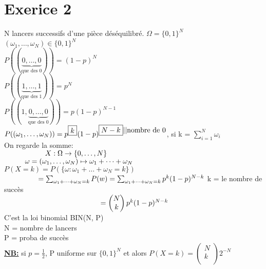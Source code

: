 \documentclass{article}
\author{Frederic Becerril}
\newcommand\tab[1][1cm]{\hspace*{#1}}
\newcommand{\important}[1]{{\color{red}\underline{\textbf{#1}}}}
\newcommand{\hbrace}[2]{\underset{#1}{\underbrace{#2}}}
\begin{document}
\part*{Exerice 2}

N lancers successifs d'une pièce déséquilibré. $\Omega = \{0, 1\}^N$\\
$(\omega_1, \dots, \omega_N) \in \{0, 1\}^N$\\
$P((\hbrace{\mbox{que des 0}}{0, \dots, 0})) = (1-p)^N$\\
$P((\hbrace{\mbox{que des 1}}{1, \dots, 1})) = p^N$\\
$P((1, \hbrace{\mbox{que des 0}}{0, \dots, 0})) = p (1-p)^{N -1}$\\
$P((\omega_1, \dots, \omega_N)) = p^{\fbox{$k$}}(1-p)^{\fbox{$N-k$}\mbox{||nombre de 0}}$, si k = $\sum_{i=1}^N \omega_i$\\
On regarde la somme:\\
$\tab[2cm] X:\Omega \rightarrow \{0, \dots, N\}$\\
$\tab \omega = (\omega_1, \dots, \omega_N) \mapsto \omega_1 + \dots + \omega_N$\\
$P(X = k) = P(\{\omega : \omega_1 + \dots + \omega_N = k\})$\\
$\tab[1.65cm] = \sum_{\omega_1 + \dots + \omega_N = k} P(w) = \sum_{\omega_1 + \dots + \omega_N = k} p^k(1-p)^{N-k}$ k = le nombre de succès \vspace{3mm}\\
$\tab[4.7cm] = \begin{pmatrix}
    N\\
    k\\
\end{pmatrix}  p^k(1-p)^{N-k}$\\
C'est la loi binomial BIN(N, P)\\
N = nombre de lancers\\
P = proba de succès\\
\important{NB:} si $p = \frac{1}{2}$, P uniforme sur $\{0, 1\}^N$ et alors $P(X = k) = \begin{pmatrix}
    N\\
    k\\
\end{pmatrix}2^{-N}$
\end{document}
